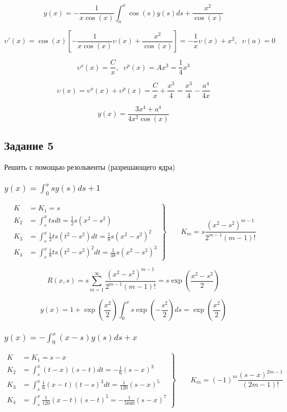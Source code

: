 \documentclass[
11pt,
master, %
subf, %
href, %
colorlinks=true, %
times, %
]{disser}
\begin{document}
$$y(x) = -\frac{1}{x\cos(x)}\int_{a}^{x} \cos(s)y(s)ds + \frac{x^2}{\cos(x)}$$

$$\upsilon'(x) = \cos(x)\left[-\frac{1}{x \cos(x)} \upsilon(x) + \frac{x^2}{\cos(x)}\right] = -\frac{1}{x}\upsilon(x) + x^2, \;\; \upsilon(a) = 0$$

$$\upsilon^o(x) = \frac{C}{x}, \;\; \upsilon^{p}(x) = A x^3 = \frac{1}{4} x^3$$

$$\upsilon(x) = \upsilon^o(x) + \upsilon^{p}(x) = \frac{C}{x} + \frac{x^3}{4} = \frac{x^3}{4} -\frac{a^4}{4x}$$

$$y(x) = \frac{3x^4 + a^4}{4x^2\cos(x)}$$

\subsection{Задание 5}
Решить с помощью резольвенты (разрешающего ядра)
\subsubsection{$\displaystyle y(x) =  \int_{0}^{x} s y(s)ds + 1$}

\begin{equation*}
 \left.\begin{aligned}
        K &= K_1 = s\\
        K_2 &= \int_{s}^{x} ts dt  = \frac{1}{2}s\left(x^2 - s^2\right)\\
        K_3 &= \int_{s}^{x} \frac{1}{2} t s\left(t^2 - s^2\right) dt = \frac{1}{8}s(x^2-s^2)^2\\
        K_4 &= \int_{s}^{x} \frac{1}{8} ts(t^2-s^2)^2 dt = \frac{1}{48}s(x^2-s^2)^3
       \end{aligned}
 \right\}
 \qquad K_m = s\frac{\left(x^2-s^2\right)^{m-1}}{2^{m-1} (m-1)!}
\end{equation*}

$$R(x,s) = s \sum_{m=1}^{\infty} \frac{\left(x^2-s^2\right)^{m-1}}{2^{m-1} (m-1)!} = s\exp\left(\frac{x^2-s^2}{2}\right)$$

$$y(x) = 1 + \exp\left(\frac{x^2}{2}\right)\int_{0}^{x} s\exp\left(-\frac{s^2}{2}\right)ds = \exp\left(\frac{x^2}{2}\right)$$

\subsubsection{$\displaystyle y(x) =  -\int_{0}^{x} (x-s) y(s)ds + x$}

\begin{equation*}
 \left.\begin{aligned}
        K &= K_1 = s-x\\
        K_2 &= \int_{s}^{x} (t-x)(s-t) dt  = -\frac{1}{6}(s-x)^3\\
        K_3 &= \int_{s}^{x} \frac{1}{6} (x-t) (t-s)^3 dt = \frac{1}{120}(s-x)^5\\
        K_4 &= \int_{s}^{x} \frac{1}{120} (x-t) (s-t)^5 = -\frac{1}{5040}(s-x)^7
       \end{aligned}
 \right\}
 \qquad K_m = (-1)^m\frac{(s-x)^{2m-1}}{(2m-1)!}
\end{equation*}
\end{document}
